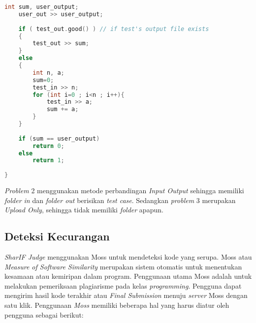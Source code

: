 \begin{enumerate}
\begin{lstlisting}[language=C++,caption=Kode metode perbandingan \textit{tester} dengan bahasa \textit{tester.cpp}, label=kode:cppfileproblem1]
	int sum, user_output;
	user_out >> user_output;
 
	if ( test_out.good() ) // if test's output file exists
	{
		test_out >> sum;
	}
	else
	{
		int n, a;
		sum=0;
		test_in >> n;
		for (int i=0 ; i<n ; i++){
			test_in >> a;
			sum += a;
		}
	}
 
	if (sum == user_output)
		return 0;
	else
		return 1;
 
}
\end{lstlisting}

\textit{Problem} 2 menggunakan metode perbandingan \textit{Input Output} sehingga memiliki \textit{folder in} dan \textit{folder out} berisikan \textit{test case}. Sedangkan \textit{problem} 3 merupakan \textit{Upload Only}, sehingga tidak memiliki \textit{folder} apapun.

\end{enumerate}

\subsection{Deteksi Kecurangan}
\textit{SharIF Judge} menggunakan Moss untuk mendeteksi kode yang serupa. Moss atau \textit{Measure of Software Similarity} merupakan sistem otomatis untuk menentukan kesamaan atau kemiripan dalam program. Penggunaan utama Moss adalah untuk melakukan pemeriksaan plagiarisme pada kelas \textit{programming}. Pengguna dapat mengirim hasil kode terakhir atau \textit{Final Submission} menuju \textit{server} Moss dengan satu klik. Penggunaan \textit{Moss} memiliki beberapa hal yang harus diatur oleh pengguna sebagai berikut:

